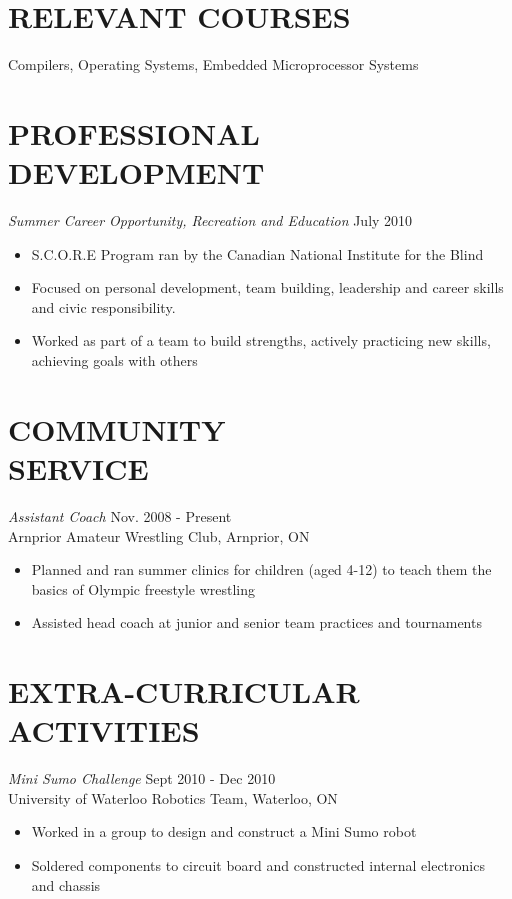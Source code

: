 \documentclass[margin]{res}
\begin{document}
\begin{resume}

\section{RELEVANT COURSES} 
Compilers, Operating Systems, Embedded Microprocessor Systems
 
\section{PROFESSIONAL DEVELOPMENT} {\sl Summer Career Opportunity, Recreation and Education} \hfill July 2010
\begin{itemize} \itemsep -2pt
  \item S.C.O.R.E Program ran by the Canadian National Institute for the Blind
  \item Focused on personal development, team building, leadership and career skills and civic responsibility.
  \item Worked as part of a team to build strengths, actively practicing new skills, achieving goals with others
\end{itemize}
 
\section{COMMUNITY \\ SERVICE}  {\sl Assistant Coach} \hfill Nov. 2008 - Present\\
Arnprior Amateur Wrestling Club, Arnprior, ON
\begin{itemize}\itemsep -2pt
  \item Planned and ran summer clinics for children (aged 4-12) to teach them the basics of Olympic freestyle wrestling
  \item Assisted head coach at junior and senior team practices and tournaments 
\end{itemize}

\section{EXTRA-CURRICULAR \\ ACTIVITIES}                
{\it Mini Sumo Challenge}  \hfill Sept 2010 - Dec 2010\\
University of Waterloo Robotics Team, Waterloo, ON
\begin{itemize} \itemsep -2pt
  \item Worked in a group to design and construct a Mini Sumo robot 
  \item Soldered components to circuit board and constructed internal electronics and chassis
\end{itemize}


\end{resume}
\end{document}
